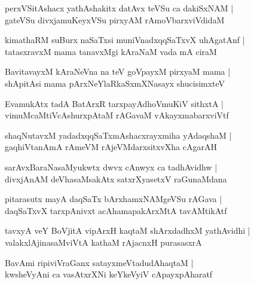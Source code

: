 \begin{shloka}
perxVSitAshacx yathAshakitx datAvx teVSu ca dakiSxNAM |\\
gateVSu divxjamuKeyxVSu pirxyAM rAmoVbarxviVdidaM 
\end{shloka}

\begin{shloka}
kimathaRM suBurx naSaTxsi muniVnadxqqSaTxvX uhAgatAnf |\\
tatasxravxM mama tanavxMgi kAraNaM vada mA ciraM 
\end{shloka}

\begin{shloka}
BavitavayxM kAraNeVna na teV goVpayxM pirxyaM mama |\\
shApitAsi mama pArxNeYlaRkaSxmXNasayx shucisimxteV
\end{shloka}

\begin{shloka}
EvamukAtx tadA BatArxR tarxpayAdhoVmuKiV sithxtA |\\
vimuMcaMtiVcAshurxpAtaM rAGavaM vAkayxmabarxviVtf 
\end{shloka}

\begin{shloka}
shaqNutavxM yadadxqqSaTxmAshacxrayxmiha yAdaqshaM |\\
gaqhiVtanAmA rAmeVM rAjeVMdarxsitxvXha cAgarAH
\end{shloka}

\begin{shloka}
sarAvxBaraNasaMyukwtx dwvx cAnwyx ca tadhAvidhw |\\
divxjAnAM deVhasaMsakAtx satxrXyasetxV raGunaMdana
\end{shloka}

\begin{shloka}
pitarasutx mayA daqSaTx bArxhamxNAMgeVSu rAGava |\\
daqSaTxvX tarxpAnivxt acAhamapakArxMtA tavAMtikAtf 
\end{shloka}

\begin{shloka}
tavxyA veY BoVjitA vipArxH kaqtaM shArxdadhxM yathAvidhi |\\
valakxlAjinasaMviVtA kathaM rAjacnxH purasasxrA 
\end{shloka}

\begin{shloka}
BavAmi ripiviVraGanx satayxmeVtadudAhaqtaM |\\
kwsheVyAni ca vasAtxrXNi keYkeVyiV cApayxpAharatf 
\end{shloka}

